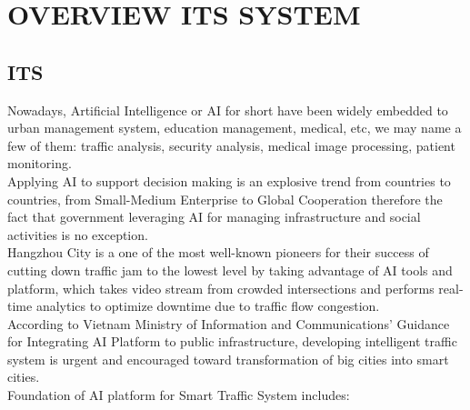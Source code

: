 \chapter{OVERVIEW ITS SYSTEM}

\renewcommand{\headrulewidth}{0.5pt}
\renewcommand{\footrulewidth}{0.5pt}
\thispagestyle{plain}
\pagestyle{fancy}
\fancyhf{}
\raggedright
{}

\section{ITS}
    Nowadays, Artificial Intelligence or AI for short have been widely embedded to urban management system, education management, medical, etc, 
    we may name a few of them: traffic analysis, security analysis, medical image processing, patient monitoring. \\ 
    \vspace{3mm}
    Applying AI to support decision making is an explosive trend from countries to countries, from Small-Medium Enterprise to Global Cooperation 
    therefore the fact that government leveraging AI for managing infrastructure and social activities is no exception. \\ 
    \vspace{3mm}
    Hangzhou City is a one of the most well-known pioneers for their success of cutting down traffic jam to the lowest level by taking advantage of 
    AI tools and platform, which takes video stream from crowded intersections and performs real-time analytics to optimize downtime due to traffic 
    flow congestion. \\ 
    \vspace{3mm}
    According to Vietnam Ministry of Information and Communications' Guidance for Integrating AI Platform to public infrastructure, developing 
    intelligent traffic system is urgent and encouraged toward transformation of big cities into smart cities. \\ 
    \vspace{3mm}
    Foundation of AI platform for Smart Traffic System includes:

